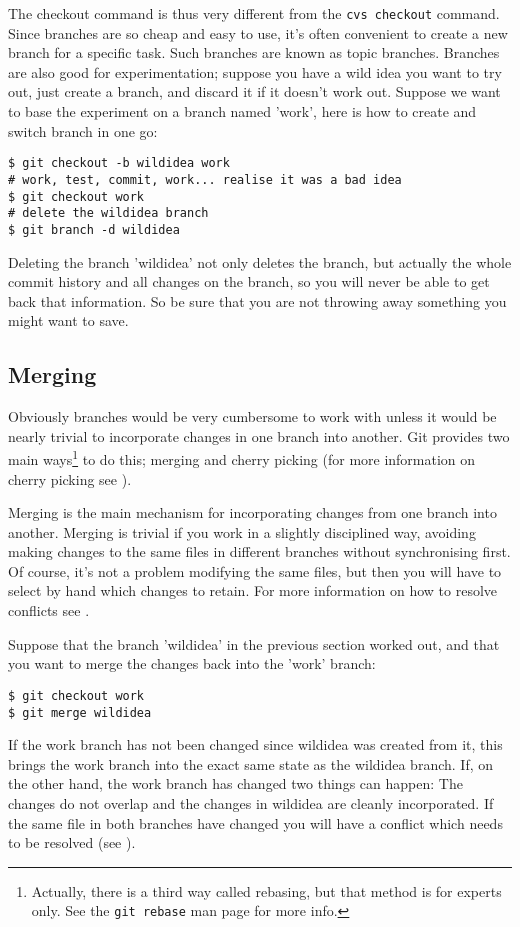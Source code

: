 \documentclass[a4paper,10pt]{article}
\begin{document}
The checkout command is thus very
different from the \texttt{cvs checkout} command.
Since branches are so cheap and easy to use, it's often convenient to create a
new branch for a specific task. Such branches are known as topic branches.
Branches are also good for experimentation; suppose you have a wild idea you
want to try out, just create a branch, and discard it if it doesn't work out.
Suppose we want to base the experiment on a branch named 'work', here is how to
create and switch branch in one go:
\begin{verbatim}
$ git checkout -b wildidea work
# work, test, commit, work... realise it was a bad idea
$ git checkout work
# delete the wildidea branch
$ git branch -d wildidea
\end{verbatim}
Deleting the branch 'wildidea' not only deletes the branch, but actually the
whole commit history and all changes on the branch, so you will never be able
to get back that information. So be sure that you are not throwing away
something you might want to save.

\subsection{Merging}
\label{sec:merge}
Obviously branches would be very cumbersome to work with unless it would be
nearly trivial to incorporate changes in one branch into another. Git provides
two main ways\footnote{Actually, there is a third way called rebasing, but
that method is for experts only. See the \texttt{git rebase} man page for more
info.} to do this; merging and cherry
picking (for more information on cherry picking see ).

Merging is the main mechanism for incorporating changes from one branch 
into another. Merging is trivial if you work in a slightly disciplined
way, avoiding making changes to the same files in different branches without
synchronising first. Of course, it's not a problem modifying the same files,
but then you will have to select by hand which changes to retain. For more
information on how to resolve conflicts see .

Suppose that the branch 'wildidea' in the previous section worked out, and
that you want to merge the changes back into the 'work' branch:
\begin{verbatim}
$ git checkout work
$ git merge wildidea
\end{verbatim}
If the work branch has not been changed since wildidea was created from it, 
this brings the work branch into 
the exact same state as the  wildidea branch. If, on the other hand, the work
branch has changed two things can happen: The changes do not overlap and the
changes in wildidea are cleanly incorporated. If the same file in both
branches have changed you will have a conflict which needs to be resolved
(see ).
\end{document}
